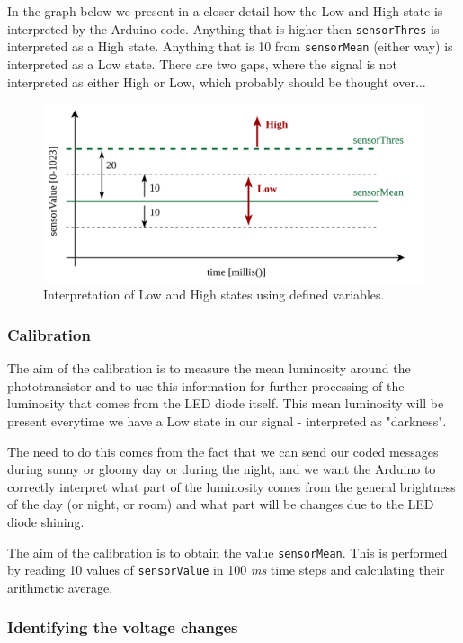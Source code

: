 \documentclass[12pt]{report}
\begin{document}
In the graph below we present in a closer detail how the Low and High state is interpreted by the Arduino code. Anything that is higher then \verb|sensorThres| is interpreted as a High state. Anything that is 10 from \verb|sensorMean| (either way) is interpreted as a Low state. There are two gaps, where the signal is not interpreted as either High or Low, which probably should be thought over...

\begin{figure}[H]
\centering\includegraphics[scale=0.18]{arduinocode}
\caption{Interpretation of Low and High states using defined variables.}				
\label{fig:arduino_code}
\end{figure}



\subsubsection{Calibration}

The aim of the calibration is to measure the mean luminosity around the phototransistor and to use this information for further processing of the luminosity that comes from the LED diode itself. This mean luminosity will be present everytime we have a Low state in our signal - interpreted as "darkness".

The need to do this comes from the fact that we can send our coded messages during sunny or gloomy day or during the night, and we want the Arduino to correctly interpret what part of the luminosity comes from the general brightness of the day (or night, or room) and what part will be changes due to the LED diode shining.

The aim of the calibration is to obtain the value \verb|sensorMean|. This is performed by reading 10 values of \verb|sensorValue| in 100 \textit{ms} time steps and calculating their arithmetic average.

\subsubsection{Identifying the voltage changes}
\end{document}
